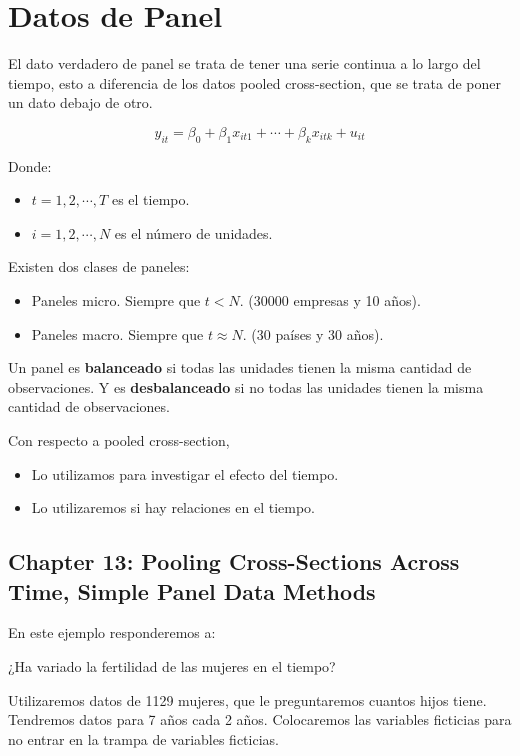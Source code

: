 \chapter{Datos de Panel}

El dato verdadero de panel se trata de tener una serie continua a lo largo del tiempo, esto a diferencia de los datos pooled cross-section, que se trata de poner un dato debajo de otro.

$$y_{it} = \beta_0+\beta_1x_{it1}+\cdots + \beta_k x_{itk} + u_{it}$$

Donde:

\begin{itemize}
	\item $t= 1,2,\cdots, T$ es el tiempo.
	\item $i= 1,2,\cdots, N$ es el número de unidades.
\end{itemize}

Existen dos clases de paneles:

\begin{itemize}
    \item Paneles micro. Siempre que $t<N$. (30000 empresas y 10 años).
    \item Paneles macro. Siempre que $t\approx N$. (30 países y 30 años).
\end{itemize}

Un panel es \textbf{balanceado} si todas las unidades tienen la misma cantidad de observaciones. Y es \textbf{desbalanceado} si no todas las unidades tienen la misma cantidad de observaciones.

Con respecto a pooled cross-section,
\begin{itemize}
    \item Lo utilizamos para investigar el efecto del tiempo.
    \item Lo utilizaremos si hay relaciones en el tiempo.
\end{itemize}

\section{Chapter 13: Pooling Cross-Sections Across Time, Simple Panel Data Methods}

En este ejemplo responderemos a:
\begin{center}
    ¿Ha variado la fertilidad de las mujeres en el tiempo?
\end{center}

Utilizaremos datos de 1129 mujeres, que le preguntaremos cuantos hijos tiene. Tendremos datos para 7 años cada 2 años. Colocaremos las variables ficticias para no entrar en la trampa de variables ficticias.

